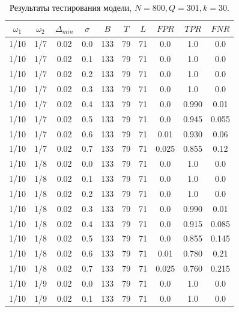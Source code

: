 \documentclass[specialist, substylefile = spbu.rtx,
			   subf, href, 12pt]{disser}
\begin{document}
\begin{table}[!hhh]
	\center
	\caption{Результаты тестирования модели, $ N = 800, Q=301, k=30 $.}
	\begin{tabular}{cccccccccc}
		\toprule
		$ \omega_1 $ & $ \omega_2 $ & $ \Delta_{min} $ & $ \sigma $ &    $ B $ &   $ T $ &   $ L $ &    $ FPR $ &    $ TPR $ &    $ FNR $ \\
		\midrule
		1/10 &      1/7 &       0.02 &    0.0 & 133 & 79 & 71 &    0.0 &    1.0 &    0.0 \\
		1/10 &      1/7 &       0.02 &    0.1 & 133 & 79 & 71 &    0.0 &    1.0 &    0.0 \\
		1/10 &      1/7 &       0.02 &    0.2 & 133 & 79 & 71 &    0.0 &    1.0 &    0.0 \\
		1/10 &      1/7 &       0.02 &    0.3 & 133 & 79 & 71 &    0.0 &    1.0 &    0.0 \\
		1/10 &      1/7 &       0.02 &    0.4 & 133 & 79 & 71 &    0.0 &  0.990 &   0.01 \\
		1/10 &      1/7 &       0.02 &    0.5 & 133 & 79 & 71 &    0.0 &  0.945 &  0.055 \\
		1/10 &      1/7 &       0.02 &    0.6 & 133 & 79 & 71 &   0.01 &  0.930 &   0.06 \\
		1/10 &      1/7 &       0.02 &    0.7 & 133 & 79 & 71 &  0.025 &  0.855 &   0.12 \\
		\hline
		1/10 &      1/8 &       0.02 &    0.0 & 133 & 79 & 71 &    0.0 &    1.0 &    0.0 \\
		1/10 &      1/8 &       0.02 &    0.1 & 133 & 79 & 71 &    0.0 &    1.0 &    0.0 \\
		1/10 &      1/8 &       0.02 &    0.2 & 133 & 79 & 71 &    0.0 &    1.0 &    0.0 \\
		1/10 &      1/8 &       0.02 &    0.3 & 133 & 79 & 71 &    0.0 &  0.990 &   0.01 \\
		1/10 &      1/8 &       0.02 &    0.4 & 133 & 79 & 71 &    0.0 &  0.915 &  0.085 \\
		1/10 &      1/8 &       0.02 &    0.5 & 133 & 79 & 71 &    0.0 &  0.855 &  0.145 \\
		1/10 &      1/8 &       0.02 &    0.6 & 133 & 79 & 71 &   0.01 &  0.780 &   0.21 \\
		1/10 &      1/8 &       0.02 &    0.7 & 133 & 79 & 71 &  0.025 &  0.760 &  0.215 \\
		\hline
		1/10 &      1/9 &       0.02 &    0.0 & 133 & 79 & 71 &    0.0 &    1.0 &    0.0 \\
		1/10 &      1/9 &       0.02 &    0.1 & 133 & 79 & 71 &    0.0 &    1.0 &    0.0 \\

\end{tabular}
\end{table}
\end{document}
